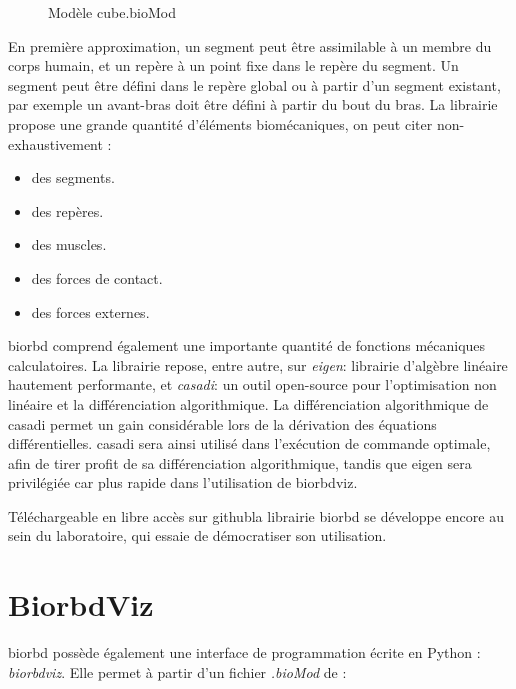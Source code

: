 \newpage


\vspace{-0.6cm}
\begin{figure}[h]
\caption{Modèle cube.bioMod}
\end{figure}

En première approximation, un segment peut être assimilable à un membre du corps humain, et un repère à un point fixe dans le repère du segment. Un segment peut être défini dans le repère global ou à partir d'un segment existant, par exemple un avant-bras doit être défini à partir du bout du bras. La librairie propose une grande quantité d'éléments biomécaniques, on peut citer non-exhaustivement :
\begin{itemize}
\setlength\itemsep{-0.5em}
\item des segments.
\item des repères.
\item des muscles.
\item des forces de contact.
\item des forces externes.
\end{itemize}

\gls{biorbd} comprend également une importante quantité de fonctions mécaniques calculatoires. La librairie repose, entre autre,
sur \emph{\gls{eigen}}\footnotemark[4] : librairie d'algèbre linéaire hautement performante, et \emph{\gls{casadi}}\footnotemark[3] : un outil open-source pour l'optimisation non linéaire et la différenciation algorithmique. La différenciation algorithmique de \gls{casadi} permet un gain considérable lors de la dérivation des équations différentielles. \gls{casadi} sera ainsi utilisé dans l'exécution de commande optimale, afin de tirer profit de sa différenciation algorithmique, tandis que \gls{eigen} sera privilégiée car plus rapide dans l'utilisation de \gls{biorbdviz}. 


Téléchargeable en libre accès sur \gls{github}\footnotemark[1] la librairie \gls{biorbd} se développe encore au sein du laboratoire, qui essaie de démocratiser son utilisation.



        
        \section{BiorbdViz}
\label{biorbdviz}
\gls{biorbd} possède également une interface de programmation écrite en Python : \emph{\gls{biorbdviz}}. Elle permet à partir d'un fichier \emph{.bioMod} de :

